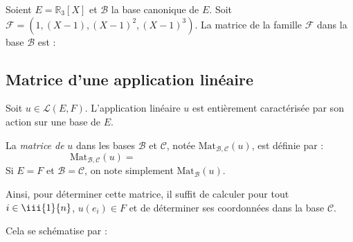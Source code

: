 \documentclass[french,11pt,twoside]{VcCours}
\begin{document}
\medskip

\begin{Exemple} Soient $E = \mathbb{R}_3[X]$ et $\mathcal{B}$ la base canonique de $E$. Soit $\mathcal{F}=(1,(X-1),(X-1)^2,(X-1)^3)$. La matrice de la famille $\mathcal{F}$ dans la base $\mathcal{B}$ est :

        \newpage
\vspace*{5cm}


\end{Exemple}


\subsection{Matrice d'une application linéaire}

Soit $u \in \mathcal{L}(E,F)$. L'application linéaire $u$ est entièrement caractérisée par son action sur une base de $E$.

\begin{Definition}{} La \emph{matrice de} $u$ dans les bases $\mathcal{B}$ et $\mathcal{C}$, notée $\textrm{Mat}_{\mathcal{B}, \mathcal{C}}(u)$, est définie par :
$$ \textrm{Mat}_{\mathcal{B}, \mathcal{C}}(u)= \phantom{\textrm{Mat}_{\mathcal{C}}(u(e_1), u(e_2), \ldots, u(e_n))}$$
Si $E=F$ et $\mathcal{B}= \mathcal{C}$, on note simplement $\textrm{Mat}_{\mathcal{B}}(u)$.
\end{Definition}

Ainsi, pour déterminer cette matrice, il suffit de calculer pour tout $i \in \iii{1}{n}$, $u(e_i) \in F$ et de déterminer ses coordonnées dans la base $\mathcal{C}$.


Cela se schématise par :

\end{document}
